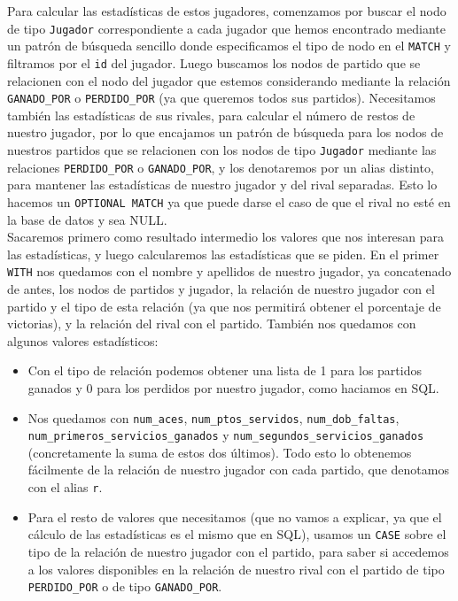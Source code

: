 Para calcular las estadísticas de estos jugadores, comenzamos por buscar el nodo de tipo \texttt{Jugador} correspondiente a cada jugador que hemos encontrado mediante un patrón de búsqueda sencillo donde especificamos el tipo de nodo en el \texttt{MATCH} y filtramos por el \texttt{id} del jugador. Luego buscamos los nodos de partido que se relacionen con el nodo del jugador que estemos considerando mediante la relación \texttt{GANADO\_POR} o \texttt{PERDIDO\_POR} (ya que queremos todos sus partidos). Necesitamos también las estadísticas de sus rivales, para calcular el número de restos de nuestro jugador, por lo que encajamos un patrón de búsqueda para los nodos de nuestros partidos que se relacionen con los nodos de tipo \texttt{Jugador} mediante las relaciones \texttt{PERDIDO\_POR} o \texttt{GANADO\_POR}, y los denotaremos por un alias distinto, para mantener las estadísticas de nuestro jugador y del rival separadas. Esto lo hacemos un \texttt{OPTIONAL MATCH} ya que puede darse el caso de que el rival no esté en la base de datos y sea NULL. \\

Sacaremos primero como resultado intermedio los valores que nos interesan para las estadísticas, y luego calcularemos las estadísticas que se piden. En el primer \texttt{WITH} nos quedamos con el nombre y apellidos de nuestro jugador, ya concatenado de antes, los nodos de partidos y jugador, la relación de nuestro jugador con el partido y el tipo de esta relación (ya que nos permitirá obtener el porcentaje de victorias), y la relación del rival con el partido. También nos quedamos con algunos valores estadísticos: 
\begin{itemize}
\item Con el tipo de relación podemos obtener una lista de 1 para los partidos ganados y 0 para los perdidos por nuestro jugador, como haciamos en SQL.
\item Nos quedamos con \texttt{num\_aces}, \texttt{num\_ptos\_servidos}, \texttt{num\_dob\_faltas}, \texttt{num\_primeros\_servicios\_ganados} y \texttt{num\_segundos\_servicios\_ganados} (concretamente la suma de estos dos últimos). Todo esto lo obtenemos fácilmente de la relación de nuestro jugador con cada partido, que denotamos con el alias \texttt{r}.
\item Para el resto de valores que necesitamos (que no vamos a explicar, ya que el cálculo de las estadísticas es el mismo que en SQL), usamos un \texttt{CASE} sobre el tipo de la relación de nuestro jugador con el partido, para saber si accedemos a los valores disponibles en la relación de nuestro rival con el partido de tipo \texttt{PERDIDO\_POR} o de tipo \texttt{GANADO\_POR}.
\end{itemize}

